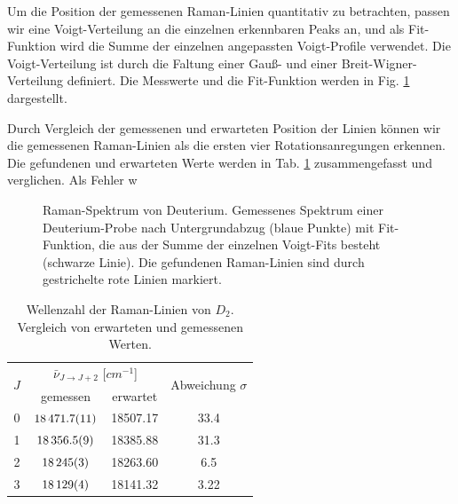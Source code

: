 \documentclass[11pt]{article}
\begin{document}
Um die Position der gemessenen Raman-Linien quantitativ zu betrachten, passen wir eine Voigt-Verteilung an die einzelnen erkennbaren Peaks an, und als Fit-Funktion wird die Summe der einzelnen angepassten Voigt-Profile verwendet. Die Voigt-Verteilung ist durch die Faltung einer Gauß- und einer Breit-Wigner-Verteilung definiert. Die Messwerte und die Fit-Funktion werden in Fig. \ref{fig:Deuterium} dargestellt. 

Durch Vergleich der gemessenen und erwarteten Position der Linien können wir die gemessenen Raman-Linien als die ersten vier Rotationsanregungen erkennen. Die gefundenen und erwarteten Werte werden in Tab. \ref{tab:D2} zusammengefasst und verglichen. Als Fehler w

\begin{figure}[htbp]
	\centering
   \caption{\small Raman-Spektrum von Deuterium. Gemessenes Spektrum einer Deuterium-Probe nach Untergrundabzug (blaue Punkte) mit Fit-Funktion, die aus der Summe der einzelnen Voigt-Fits besteht (schwarze Linie). Die gefundenen Raman-Linien sind durch gestrichelte rote Linien markiert.}
   \label{fig:Deuterium}
\end{figure}

\begin{table}[!htbp]
 \begin{center}
  \caption{\small Wellenzahl der Raman-Linien von $D_2$. Vergleich von erwarteten und gemessenen Werten.}
   \renewcommand{\arraystretch}{1.3} %
  \label{tab:D2}
  \begin{tabular}{|c|c|c|c|}
  \hline
\multirow{2}{*}{$J$}& \multicolumn{2}{c|}{$\bar{\nu}_{J\to J+2}$ [$\unit{cm^{-1}}$]} &  \multirow{2}{*}{ Abweichung $\sigma$} \\ \cline{2-3} %
 					 & gemessen & erwartet &    			\\ 
  \hline
	\hline 
0 & $\num{18471.7\pm 1.1}$	& 18507.17	& 33.4 \\
1 & $\num{18356.5	\pm 0.9}$	& 18385.88	& 31.3 \\
2 & $\num{18245\pm 3}$	& 18263.60	& 6.5	 \\
3 & $\num{18129\pm 4}$	& 18141.32	& 3.22 \\
	\hline
  \end{tabular}
  \renewcommand{\arraystretch}{1} 

 \end{center}
\end{table}
\end{document}
